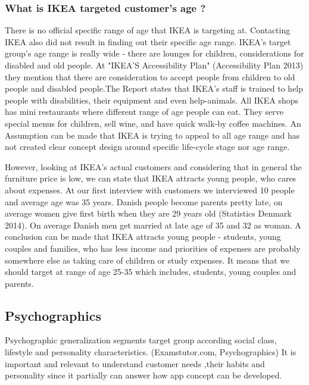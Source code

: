 \subsubsection{What is IKEA targeted customer's age ?}
There is no official specific range of age that IKEA is targeting at. Contacting IKEA also did not result in finding out their specific age range. IKEA's target group's age range is really wide - there are lounges for children, considerations for disabled and old people. At "IKEA'S Accessibility Plan" (Accessibility Plan 2013) they mention that there are consideration to accept people from children to old people and disabled people.The Report states that IKEA's staff is trained to help people with disabilities, their equipment and even help-animals. All IKEA shops has mini restaurants where different range of age people can eat. They serve special menus for children, sell wine, and have quick walk-by coffee machines. An Assumption can be made that IKEA is trying to appeal to all age range and has not created clear concept design around specific life-cycle stage  nor age range. 

However, looking at IKEA's actual customers and considering that in general the furniture price is low, we can state that IKEA attracts young people, who cares about expenses. At our first interview with customers we interviewed 10 people and average age was 35 years. Danish people become parents pretty late, on average women give first birth when they are 29 years old (Statistics Denmark 2014). On average Danish men get married at late age of 35 and 32 as woman. A conclusion can be made that IKEA attracts young people - students, young couples and families, who has less income and priorities of expenses are probably somewhere else as taking care of children or study expenses. It means that we should target at range of age 25-35 which includes, students, young couples and parents.  
\subsection{Psychographics}
Psychographic generalization segments target group according social class, lifestyle and personality characteristics. (Examstutor.com, Psychographics) It is important and relevant to understand customer needs ,their habits and personality since it partially can answer how app concept can be developed.

